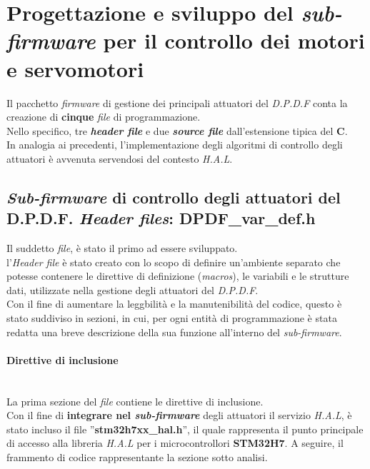 
\section{Progettazione e sviluppo del \textit{sub-firmware} per il controllo dei motori e servomotori}

Il pacchetto \textit{firmware} di gestione dei principali attuatori del \textit{D.P.D.F} conta la creazione di \textbf{cinque} \textit{file} di programmazione.\\
Nello specifico, tre \textbf{\textit{header file}} e due \textbf{\textit{source file}} dall'estensione tipica del \textbf{C}.\\
In analogia ai precedenti, l'implementazione degli algoritmi di controllo degli attuatori è avvenuta servendosi del contesto \textit{H.A.L}.


\subsection{\textit{Sub-firmware} di controllo degli attuatori del D.P.D.F. \textit{Header files}: DPDF\_var\_def.h}
\label{DPDF_var_def}
Il suddetto \textit{file}, è stato il primo ad essere sviluppato.\\
l'\textit{Header file} è stato creato con lo scopo di definire un'ambiente separato che potesse contenere le direttive di definizione (\textit{macros}), le variabili e le strutture dati, utilizzate nella gestione degli attuatori del \textit{D.P.D.F}.\\
Con il fine di aumentare la leggbilità e la manutenibilità del codice, questo è stato suddiviso in sezioni, in cui, per ogni entità di programmazione è stata redatta una breve descrizione della sua funzione all'interno del \textit{sub-firmware}.

\paragraph{Direttive di inclusione}\mbox{}\\
La prima sezione del \textit{file} contiene le direttive di inclusione.\\
Con il fine di \textbf{integrare nel \textit{sub-firmware}} degli attuatori il servizio \textit{H.A.L}, è stato incluso il file ''\textbf{stm32h7xx\_hal.h}'', il quale rappresenta il punto principale di accesso alla libreria \textit{H.A.L} per i microcontrollori \textbf{STM32H7}.
A seguire, il frammento di codice rappresentante la sezione sotto analisi.\\


